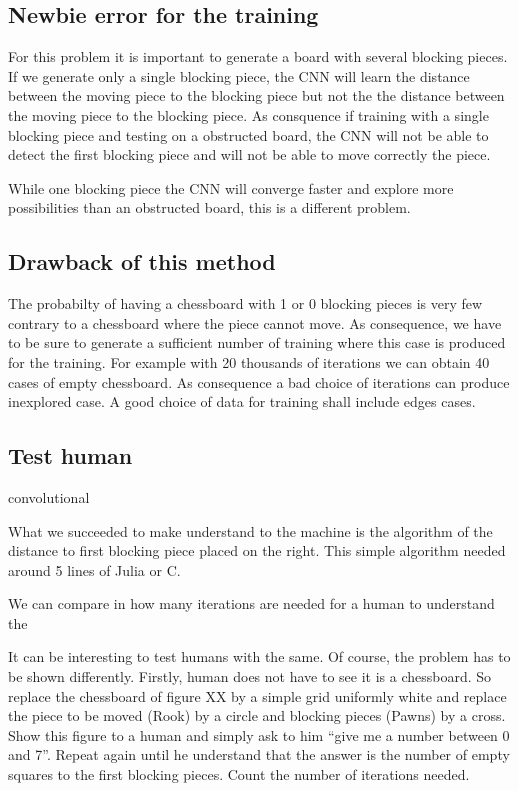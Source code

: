 \documentclass[a4paper,10pt]{article}
\begin{document}
\subsection{Newbie error for the training}

For this problem it is important to generate a board with several blocking
pieces. If we generate only a single blocking piece, the CNN will learn the
distance between the moving piece to the blocking piece but not the the distance
between the moving piece to the  blocking piece. As consquence if
training with a single blocking piece and testing on a obstructed board, the CNN
will not be able to detect the first blocking piece and will not be able to move
correctly the piece.

While one blocking piece the CNN will converge faster and explore more
possibilities than an obstructed board, this is a different problem.

\subsection{Drawback of this method}

The probabilty of having a chessboard with 1 or 0 blocking pieces is very few
contrary to a chessboard where the piece cannot move. As consequence, we have to
be sure to generate a sufficient number of training where this case is produced
for the training. For example with 20 thousands of iterations we can obtain 40
cases of empty chessboard. As consequence a bad choice of iterations can produce
inexplored case. A good choice of data for training shall include edges cases.

\subsection{Test human} convolutional

What we succeeded to make understand to the machine is the algorithm of the
distance to first blocking piece placed on the right. This simple algorithm
needed around 5 lines of Julia or C.

We can compare in how many iterations are needed for a human to understand the

It can be interesting to test humans with the same. Of course, the problem has
to be shown differently. Firstly, human does not have to see it is a chessboard.
So replace the chessboard of figure XX by a simple grid uniformly white and
replace the piece to be moved (Rook) by a circle and blocking pieces (Pawns) by
a cross. Show this figure to a human and simply ask to him ``give me a number
between 0 and 7''. Repeat again until he understand that the answer is the
number of empty squares to the first blocking pieces. Count the
number of iterations needed.
\end{document}
